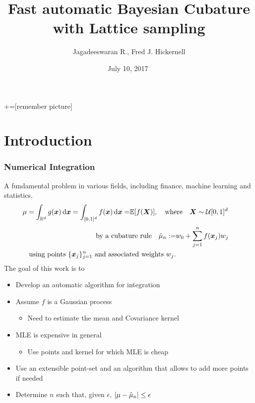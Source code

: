 \documentclass[10pt,compress,xcolor={usenames,dvipsnames}]{beamer} %
\title[]{Fast automatic Bayesian Cubature \\
	with Lattice sampling
\\[1.0ex] }
\author[]{Jagadeeswaran R., Fred J. Hickernell}
\institute{Department of Applied Mathematics,  Illinois Institute of Technology, Chicago IL
\\
\href{mailto:jrathin1@iit.edu}{\url{jrathin1@iit.edu}} }
\date[]{ \textbullet\ July 10, 2017 \textbullet\ }
\newcommand{\Ex}{\mathbb{E}}
\newcommand{\errtol}{{\epsilon}}
\def\abs#1{\ensuremath{\left \lvert #1 \right \rvert}}
\begin{document}
+=[remember picture]
\everymath{\displaystyle}


\frame{\titlepage}







\iffalse

\begin{frame}{\contentsname}
    \begin{minipage}{\textwidth}
    	\vspace{-6ex}
		\linespread{1.4}
		\begin{multicols}{2}
		\tableofcontents
		\end{multicols}
    \end{minipage}
\end{frame}
\fi

\section{Introduction}
\frame
{
\frametitle{Numerical Integration}
\vspace{-5ex}
A fundamental problem in various fields, including finance, machine learning and statistics.
\vspace{-2ex}
\begin{align*}
\mu = \int_{\reals^d} g(\vx) \,  \dif \vx = \int_{[0,1]^d} f(\vx) \,
\dif\vx  = & \Ex[f(\vX)], \quad \text{where} \quad \vX \sim \cu [0,1]^d
\end{align*}
\vspace{-5ex}
\begin{align*}
\text{by a  cubature rule} \quad
\hat{\mu}_n := & w_0 + \sum_{j=1}^{n} f(\boldsymbol{x}_j) w_j \qquad
\\
\qquad \text{using  points $\{\boldsymbol{x}_j \}_{j=1}^{n}$ and associated weights $w_j$.}
\end{align*}
\pause
The goal of this work is to
\vspace{-3ex}
\begin{itemize}
\item Develop an automatic algorithm for integration
\item Assume \alert{$f$} is a Gaussian process
\begin{itemize}
\item Need to estimate the mean and Covariance kernel
\end{itemize}
\item MLE is expensive in general
\begin{itemize}
\item Use points and kernel for which MLE is cheap
\end{itemize}
\item Use an \alert{extensible} point-set and an algorithm that allows to add more points if needed
\item Determine \alert{$n$} such that, given \alert{$\errtol$}, $\abs{\mu-\hmu_n} \leq \errtol$
\end{itemize}
}
\end{document}
